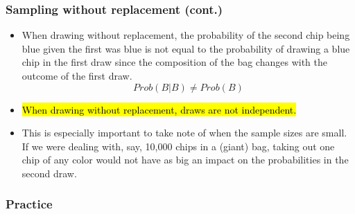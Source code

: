 \begin{frame}
\frametitle{Sampling without replacement (cont.)}

\begin{itemize}

\item When drawing without replacement, the probability of the second chip being blue given the first was blue is not equal to the probability of drawing a blue chip in the first draw since the composition of the bag changes with the outcome of the first draw.
\[ Prob(B | B) \ne Prob(B) \]

\pause

\item \hl{When drawing without replacement, draws are not independent.}

\pause

\item This is especially important to take note of when the sample sizes are small. If we were dealing with, say, 10,000 chips in a (giant) bag, taking out one chip of any color would not have as big an impact on the probabilities in the second draw.

\end{itemize}

\end{frame}


\begin{frame}
\frametitle{Practice}


{
\soln{
\pause
\[ P(ace~then~3) = \frac{4}{52} \times \frac{4}{51} \approx 0.0060 \]
}}

\end{frame}

